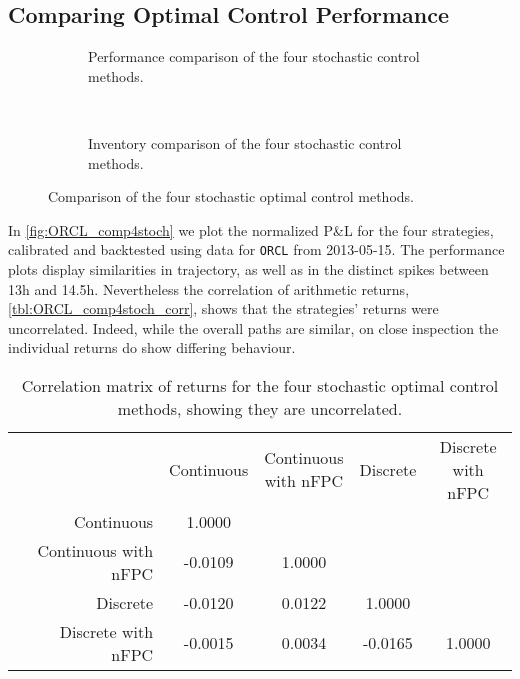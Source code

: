 \subsection{Comparing Optimal Control Performance}

\begin{figure}%
  \centering%
\begin{subfigure}[b]{0.9\linewidth}%
  \setlength{}%
  \setlength\figurewidth{\linewidth}%
  \caption{Performance comparison of the four stochastic control methods.}\label{fig:ORCL_comp4stoch}%
\end{subfigure}\\%
\vspace{1cm}%
\begin{subfigure}[b]{0.9\linewidth}%
  \centering%
  \setlength{}%
  \setlength\figurewidth{\linewidth}%
  \caption{Inventory comparison of the four stochastic control methods.}\label{fig:ORCL_comp4stoch_inv}%
\end{subfigure}%
\caption[Comparison of the four stochastic optimal control methods]{Comparison of the four stochastic optimal control methods.}%
\end{figure}
In \autoref{fig:ORCL_comp4stoch} we plot the normalized P\&L for the four strategies, calibrated and backtested using data for \texttt{ORCL} from 2013-05-15. The performance plots display similarities in trajectory, as well as in the distinct spikes between 13h and 14.5h. Nevertheless the correlation of arithmetic returns, \autoref{tbl:ORCL_comp4stoch_corr}, shows that the strategies' returns were uncorrelated. Indeed, while the overall paths are similar, on close inspection the individual returns do show differing behaviour.
\begin{table}[H]
\centering
{}
\caption[Correlation matrix of stochastic optimal control returns]{Correlation matrix of returns for the four stochastic optimal control methods, showing they are uncorrelated.}\label{tbl:ORCL_comp4stoch_corr}
\begin{tabular}{@{} r *{4}{c} @{}}
\toprule
& Continuous & \cellbreak{t}{c}{Continuous \\ with nFPC} & Discrete & \cellbreak{t}{c}{Discrete \\ with nFPC} \\
\cmidrule{2-5}
Continuous          &  1.0000  & & & \\
Continuous with nFPC   & -0.0109  &  1.0000 &  & \\
Discrete         & -0.0120  &  0.0122 &   1.0000 &  \\
Discrete with nFPC  & -0.0015  &  0.0034 &  -0.0165 &   1.0000 \\
\bottomrule
\end{tabular}
\end{table}
